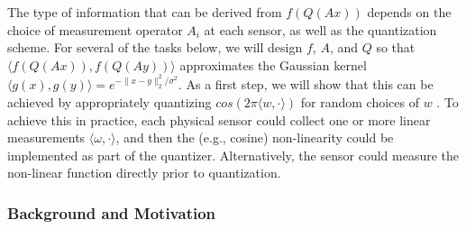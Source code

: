 The type of information that can be derived from $f(Q(Ax))$ depends on
the choice of measurement operator $A_i$ at each sensor, as well as
the quantization scheme.  For several of the tasks below, we will
design $f$, $A$, and $Q$ so that $\langle f(Q(Ax)), f(Q(Ay))\rangle$
approximates the Gaussian kernel $\langle g(x), g(y) \rangle =
e^{-\|x-y\|_2^2/\sigma^2}$.  As a first step, we will show that this
can be achieved by appropriately quantizing $cos(2\pi \langle w, \cdot
\rangle)$ for random choices of $w$ \cite{rahimi2008random}. To
achieve this in practice, each physical sensor could collect one or
more linear measurements $\langle \omega, \cdot \rangle$, and then the
(e.g., cosine) non-linearity could be implemented as part of the
quantizer. Alternatively, the sensor could measure the non-linear
function directly prior to quantization.

\subsubsection*{Background and Motivation}

